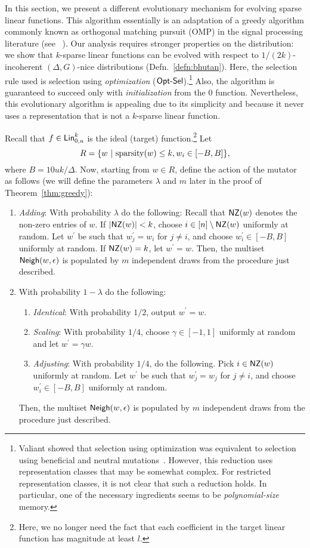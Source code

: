 In this section, we present a different evolutionary mechanism for evolving
sparse linear functions. This algorithm essentially is an adaptation of a greedy
algorithm commonly known as orthogonal matching pursuit (OMP) in the signal
processing literature (see ~\cite{Donoho:2006-recovery, Tropp:2004-greed}). Our
analysis requires stronger properties on the distribution: we show that
$k$-sparse linear functions can be evolved with respect to $1/(2k)$-incoherent
$(\Delta, G)$-nice distributions (Defn.~\ref{defn:bhutan}). Here, the
selection rule used is selection using \emph{optimization}
($\mathsf{Opt\mbox{-}Sel}$).\footnote{Valiant showed that selection using optimization was
equivalent to selection using beneficial and neutral
mutations~\cite{Valiant:2009-evolvability}. However, this reduction uses
representation classes that may be somewhat complex. For restricted
representation classes, it is not clear that such a reduction holds. In
particular, one of the necessary ingredients seems to be \emph{polynomial-size}
memory.} Also, the algorithm is guaranteed to succeed only with
\emph{initialization} from the $0$ function.  Nevertheless, this evolutionary
algorithm is appealing due to its simplicity and because it never uses a
representation that is not a $k$-sparse linear function.

Recall that $f \in  \mathsf{Lin}^k_{0, u}$ is the ideal (target)
function.\footnote{Here, we no longer need the fact that each coefficient in the
target linear function has magnitude at least $l$.} Let 
%
\[ R = \{w ~|~ \mathrm{sparsity}(w) \leq k, w_i \in [-B, B] \}, \]
%
where $B = 10uk/\Delta$. Now, starting from $w \in R$, define the action of the
mutator as follows (we will define the parameters $\lambda$ and $m$ later in the
proof of Theorem~\ref{thm:greedy}):
\begin{enumerate}
\item {\em Adding}: With probability $\lambda$ do the following: Recall that
$\mathsf{NZ}(w)$ denotes the non-zero entries of $w$. If $|\mathsf{NZ}(w)| < k$, choose $i \in [n]
\setminus \mathsf{NZ}(w)$ uniformly at random. Let $w^\prime$ be such that $w^\prime_j =
w_i$ for $j \neq i$, and choose $w^\prime_i \in [-B, B]$ uniformly at random. If
$\mathsf{NZ}(w)= k$, let $w^\prime = w$. Then, the multiset $\mathsf{Neigh}(w, \epsilon)$ is
populated by $m$ independent draws from the procedure just described.
%
\item With probability $1 - \lambda$ do the following:
%
\begin{enumerate}
\item {\em Identical}: With probability $1/2$, output $w^\prime = w$.
\item {\em Scaling}: With probability $1/4$, choose $\gamma \in [-1, 1]$ uniformly at
random and let $w^\prime = \gamma w$.
%
\item {\em Adjusting}: With probability $1/4$, do the following.  Pick $i \in \mathsf{NZ}(w)$
uniformly at random.  Let $w^\prime$ be such that $w^\prime_j = w_j$ for $j \neq
i$, and choose $w^\prime_i \in [-B, B]$ uniformly at random.
\end{enumerate}
Then, the multiset $\mathsf{Neigh}(w, \epsilon)$ is populated by $m$ independent draws
from the procedure just described.
\end{enumerate}


